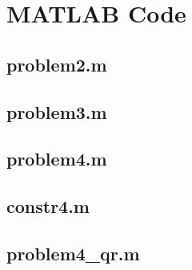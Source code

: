 \section{MATLAB Code}\label{sec:matlab}

\subsection{problem2.m}\label{sec:problem2_m}


\subsection{problem3.m}\label{sec:problem3_m}


\subsection{problem4.m}\label{sec:problem4_m}


\subsection{constr4.m}\label{sec:constr4_m}


\subsection{problem4\_qr.m}\label{sec:problem4_lqr_m}
